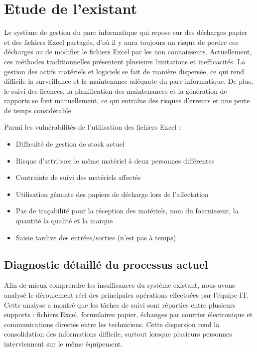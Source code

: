 \section{Etude de l’existant}

Le système de gestion du parc informatique qui repose sur des décharges papier et des fichiers Excel partagés, d’où il y aura toujours un risque de perdre ces décharges ou de modifier le fichiers Excel par les non connaisseurs. 
Actuellement, ces méthodes traditionnelles présentent plusieurs limitations et inefficacités. La gestion des actifs matériels et logiciels se fait de manière dispersée, ce qui rend difficile la surveillance et la maintenance adéquate du parc informatique. 
De plus, le suivi des licences, la planification des maintenances et la génération de rapports se font manuellement, ce qui entraîne des risques d'erreurs et une perte de temps considérable.

    
Parmi les vulnérabilités de l’utilisation des fichiers Excel :

\begin{itemize}[label=\textbullet,font=\normalsize]
    \item Difficulté de gestion de stock actuel
    \item Risque d’attribuer le même matériel à deux personnes différentes
    \item Contrainte de suivi des matériels affectés
    \item Utilisation gênante des papiers de décharge lors de l’affectation
    \item Pas de traçabilité pour la réception des matériels, nom du fournisseur, la quantité la qualité et la marque 
    \item Saisie tardive des entrées/sorties (n’est pas à temps)
\end{itemize}


\subsection{Diagnostic détaillé du processus actuel}

Afin de mieux comprendre les insuffisances du système existant, nous avons analysé le déroulement réel des principales opérations effectuées par l'équipe IT. Cette analyse a montré que les tâches de suivi sont réparties entre plusieurs supports : fichiers Excel, formulaires papier, échanges par courrier électronique et communications directes entre les techniciens. Cette dispersion rend la consolidation des informations difficile, surtout lorsque plusieurs personnes interviennent sur le même équipement.

